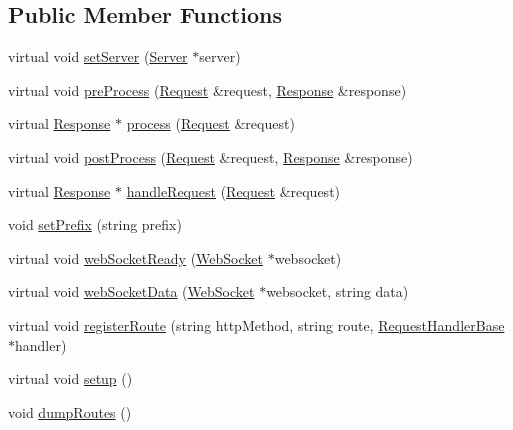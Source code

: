 \subsection*{Public Member Functions}
\begin{DoxyCompactItemize}
\item 
virtual void \hyperlink{classMongoose_1_1Controller_a9548116fa83f27ac8015947580e1f298}{set\+Server} (\hyperlink{classMongoose_1_1Server}{Server} $\ast$server)
\item 
virtual void \hyperlink{classMongoose_1_1Controller_a3eff704e4a3b4dc5a63fbfaa50a934ff}{pre\+Process} (\hyperlink{classMongoose_1_1Request}{Request} \&request, \hyperlink{classMongoose_1_1Response}{Response} \&response)
\item 
virtual \hyperlink{classMongoose_1_1Response}{Response} $\ast$ \hyperlink{classMongoose_1_1Controller_adca552473aded39dc406c6fa95908a9e}{process} (\hyperlink{classMongoose_1_1Request}{Request} \&request)
\item 
virtual void \hyperlink{classMongoose_1_1Controller_aebbfe1104785733a7a1b8b696d20d9ba}{post\+Process} (\hyperlink{classMongoose_1_1Request}{Request} \&request, \hyperlink{classMongoose_1_1Response}{Response} \&response)
\item 
virtual \hyperlink{classMongoose_1_1Response}{Response} $\ast$ \hyperlink{classMongoose_1_1Controller_a0d23611062a1cd97e50086f354888069}{handle\+Request} (\hyperlink{classMongoose_1_1Request}{Request} \&request)
\item 
void \hyperlink{classMongoose_1_1Controller_a5acbb34767fb842ce5ed442f2bfff7f0}{set\+Prefix} (string prefix)
\item 
virtual void \hyperlink{classMongoose_1_1Controller_a22c0abaf30b4eb82ea617907081ca99a}{web\+Socket\+Ready} (\hyperlink{classMongoose_1_1WebSocket}{Web\+Socket} $\ast$websocket)
\item 
virtual void \hyperlink{classMongoose_1_1Controller_a51ec9458bebbc9cbb8c230fc41650cd3}{web\+Socket\+Data} (\hyperlink{classMongoose_1_1WebSocket}{Web\+Socket} $\ast$websocket, string data)
\item 
virtual void \hyperlink{classMongoose_1_1Controller_aed1073c26ca8930754d7f6269ae6fd01}{register\+Route} (string http\+Method, string route, \hyperlink{classMongoose_1_1RequestHandlerBase}{Request\+Handler\+Base} $\ast$handler)
\item 
virtual void \hyperlink{classMongoose_1_1Controller_a4be4bd61089bd89502e2189d3e5f5490}{setup} ()
\item 
void \hyperlink{classMongoose_1_1Controller_a484400c4fbfab243397d77be6bb5cfc6}{dump\+Routes} ()

\end{DoxyCompactItemize}
